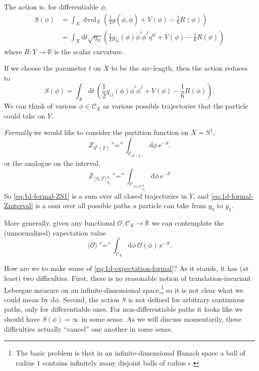 \documentclass[12pt,letterpaper,reqno]{article}
\numberwithin{equation}{section}
\newcommand{\cC}{\ensuremath{\mathcal C}}
\newcommand{\cO}{\ensuremath{\mathcal O}}
\newcommand{\R}{\ensuremath{\mathbb R}}
\newcommand{\half}{\ensuremath{\frac{1}{2}}}
\newcommand{\e}{{\mathrm e}}
\newcommand{\de}{\mathrm{d}}
\newcommand{\IP}[1]{\langle#1\rangle}
\newcommand{\eps}{\epsilon}
\newcommand{\ti}[1]{\textit{#1}}
\DeclareMathOperator{\dvol}{dvol}
\newcommand{\insfig}[2]{

\medskip
\noindent
\begin{minipage}{\linewidth}
\makebox[\linewidth]{\texttt{[image: figures/\#1-crop.pdf]}}
\end{minipage}
\noindent}
\begin{document}
The action is, for differentiable $\phi$,
\begin{align} \label{eq:1d-sigma-model-action}
  S(\phi) &= \int_X \dvol_X \left(\half g(\dot\phi,\dot\phi) + V(\phi) - \frac16 R(\phi) \right) \\
  &= \int_X \de t \sqrt{\eta_{tt}} \left(\half g_{ij}(\phi) \dot\phi^i \dot\phi^j \eta^{tt} + V(\phi) - \frac16 R(\phi)\right)
\end{align}
where $R: Y \to \R$ is the scalar curvature.

If we choose the parameter $t$ on $X$ to be the arc-length, then
the action reduces to
\begin{equation} \label{eq:1d-sigma-model-action-arc-length}
    S(\phi) = \int_X \de t \, \left( \half g_{ij}(\phi) \dot\phi^i \dot\phi^j + V(\phi) - \frac16 R(\phi) \right).
\end{equation}
We can think of various $\phi \in \cC_X$ as various possible
trajectories that the particle could take on $Y$.

\ti{Formally} we would like to consider the partition function on $X = S^1$,
\begin{equation} \label{eq:1d-formal-ZS1}
  Z_{S^1(T)} \, \text{''=''} \, \int_{\cC_{S^1(T)}} \de \phi \, \e^{-S}.
\end{equation}
or the analogue on the interval,
\begin{equation} \label{eq:1d-formal-Zinterval}
  Z_{[0,T]_{y_0}^{y_1}} \, \text{''=''} \, \int_{\cC_{[0,T]_{y_0}^{y_1}}} \de \phi \, \e^{-S}
\end{equation}
So \eqref{eq:1d-formal-ZS1} is a sum over all
closed trajectories in $Y$, and \eqref{eq:1d-formal-Zinterval} 
is a sum over all possible paths
a particle can take from $y_0$ to $y_1$.
\insfig{qft-geometry-16}{0.8}
More generally, given any functional $\cO: \cC_X \to \R$
we can contemplate the (unnormalized) expectation value
\begin{equation} \label{eq:1d-expectation-formal}
  \IP{\cO} \, \text{''=''} \, \int_{\cC_{X}} \de \phi \, \cO(\phi) \, \e^{-S}.
\end{equation}

How are we to make sense of \eqref{eq:1d-expectation-formal}?
As it stands, it has (at least) two difficulties.
First, there is no reasonable notion of translation-invariant Lebesgue measure on 
an infinite-dimensional space,\footnote{The basic problem is that in an 
infinite-dimensional Banach space a ball of radius $1$
contains infinitely many disjoint balls of radius $\eps$.} 
so it is not clear what we could mean by
$\de \phi$. Second, the action $S$ is not defined for arbitrary continuous
paths, only for differentiable ones. For non-differentiable paths it looks
like we should have $S(\phi) = \infty$ in some sense.
As we will discuss momentarily,  
these difficulties actually ``cancel'' one another
in some sense.
\end{document}
